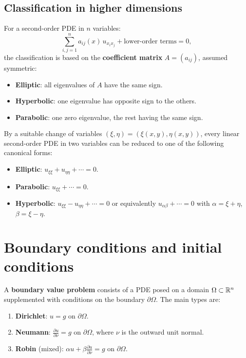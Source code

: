 \subsection{Classification in higher dimensions}

For a second-order PDE in $n$ variables:
\[
    \sum_{i,j=1}^{n} a_{ij}(x)\, u_{x_i x_j}
    + \text{lower-order terms} = 0,
\]
the classification is based on the \textbf{coefficient matrix}
$A = (a_{ij})$, assumed symmetric:
\begin{itemize}
    \item \textbf{Elliptic}: all eigenvalues of $A$ have the same sign.
    \item \textbf{Hyperbolic}: one eigenvalue has opposite sign to the others.
    \item \textbf{Parabolic}: one zero eigenvalue, the rest having the same sign.
\end{itemize}

\begin{theorem}[Canonical form --- case $n=2$]
By a suitable change of variables $(\xi, \eta) = (\xi(x,y), \eta(x,y))$,
every linear second-order PDE in two variables can be reduced to one of
the following canonical forms:
\begin{itemize}
    \item \textbf{Elliptic}: $u_{\xi\xi} + u_{\eta\eta} + \cdots = 0$.
    \item \textbf{Parabolic}: $u_{\xi\xi} + \cdots = 0$.
    \item \textbf{Hyperbolic}: $u_{\xi\xi} - u_{\eta\eta} + \cdots = 0$
          or equivalently $u_{\alpha\beta} + \cdots = 0$ with
          $\alpha = \xi + \eta$, $\beta = \xi - \eta$.
\end{itemize}
\end{theorem}

\section{Boundary conditions and initial conditions}

\begin{definition}
A \textbf{boundary value problem} consists of a PDE posed on a domain
$\Omega \subset \mathbb{R}^n$ supplemented with conditions on the boundary
$\partial\Omega$. The main types are:
\begin{enumerate}
    \item \textbf{Dirichlet}: $u = g$ on $\partial\Omega$.
    \item \textbf{Neumann}: $\frac{\partial u}{\partial \nu} = g$ on
          $\partial\Omega$, where $\nu$ is the outward unit normal.
    \item \textbf{Robin} (mixed): $\alpha u + \beta \frac{\partial u}{\partial \nu} = g$
          on $\partial\Omega$.
\end{enumerate}
\end{definition}

